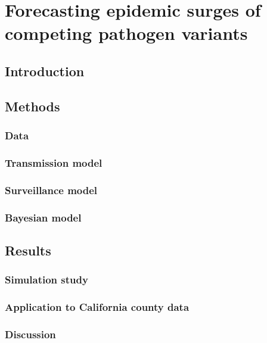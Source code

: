 \chapter{Forecasting epidemic surges of competing pathogen variants}
\label{ch:content_3}

\section{Introduction}
\label{ch_5:sec:intro}

\section{Methods}
\label{ch_5:sec:methods}

\subsection{Data}
\label{ch_5:subsec:data}

\subsection{Transmission model}
\label{ch_5:subsec:transmission}

\subsection{Surveillance model}
\label{ch_5:subsec:surveillance}

\subsection{Bayesian model}
\label{ch_5:subsec:bayesian}

\section{Results}
\label{ch_5:sec:results}

\subsection{Simulation study}
\label{ch_5:subsec:simulation}

\subsection{Application to California county data}
\label{ch_5:subsec:application}

\subsection{Discussion}
\label{ch_5:subsec:discussion}